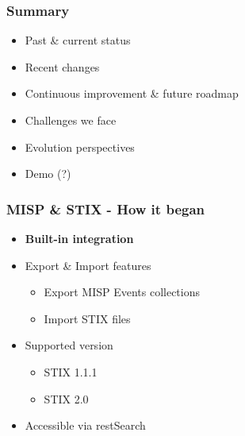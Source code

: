 \begin{frame}
    \frametitle{Summary}
    \begin{itemize}
        \item Past \& current status
        \item Recent changes
        \item Continuous improvement \& future roadmap
        \item Challenges we face
        \item Evolution perspectives
        \item Demo (?)
    \end{itemize}
\end{frame}

\begin{frame}
    \frametitle{MISP \& STIX - How it began}
    \begin{itemize}
        \item{\bf Built-in integration}
        \item Export \& Import features
        \begin{itemize}
            \item Export MISP Events collections
            \item Import STIX files
        \end{itemize}
        \item Supported version
        \begin{itemize}
            \item STIX 1.1.1
            \item STIX 2.0
        \end{itemize}
        \item Accessible via restSearch
    \end{itemize}
\end{frame}

